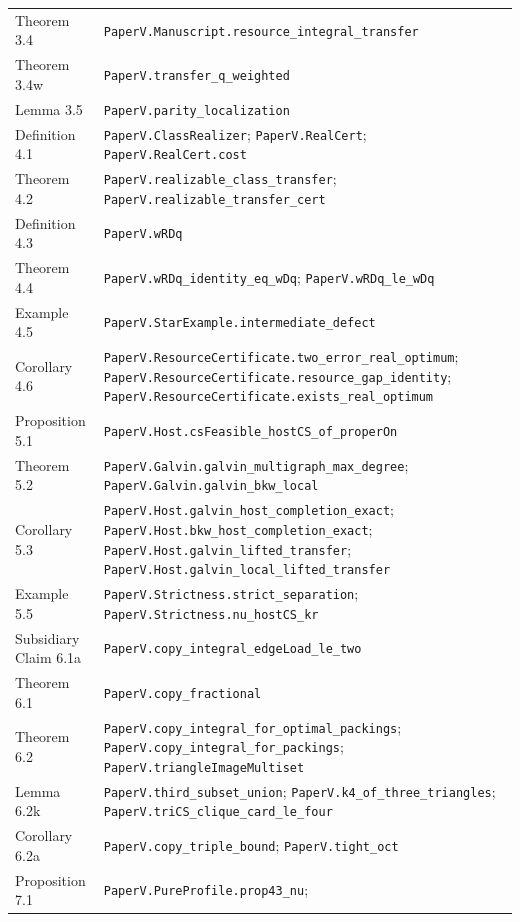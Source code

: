 \documentclass[english,11pt,a4paper]{article}
\begin{document}
{\begin{longtable}[]{@{}
  >{\raggedright\arraybackslash}p{}
  >{\raggedright\arraybackslash}p{}@{}}
Theorem 3.4 & \nolinkurl{PaperV.Manuscript.resource_integral_transfer} \\
Theorem 3.4w & \nolinkurl{PaperV.transfer_q_weighted} \\
Lemma 3.5 & \nolinkurl{PaperV.parity_localization} \\
Definition 4.1 & \nolinkurl{PaperV.ClassRealizer};
\texttt{PaperV.RealCert}; \nolinkurl{PaperV.RealCert.cost} \\
Theorem 4.2 & \nolinkurl{PaperV.realizable_class_transfer};
\nolinkurl{PaperV.realizable_transfer_cert} \\
Definition 4.3 & \texttt{PaperV.wRDq} \\
Theorem 4.4 & \nolinkurl{PaperV.wRDq_identity_eq_wDq};
\nolinkurl{PaperV.wRDq_le_wDq} \\
Example 4.5 & \nolinkurl{PaperV.StarExample.intermediate_defect} \\
Corollary 4.6 &
\nolinkurl{PaperV.ResourceCertificate.two_error_real_optimum};
\nolinkurl{PaperV.ResourceCertificate.resource_gap_identity};
\nolinkurl{PaperV.ResourceCertificate.exists_real_optimum} \\
Proposition 5.1 &
\nolinkurl{PaperV.Host.csFeasible_hostCS_of_properOn} \\
Theorem 5.2 & \nolinkurl{PaperV.Galvin.galvin_multigraph_max_degree};
\nolinkurl{PaperV.Galvin.galvin_bkw_local} \\
Corollary 5.3 & \nolinkurl{PaperV.Host.galvin_host_completion_exact};
\nolinkurl{PaperV.Host.bkw_host_completion_exact};
\nolinkurl{PaperV.Host.galvin_lifted_transfer};
\nolinkurl{PaperV.Host.galvin_local_lifted_transfer} \\
Example 5.5 & \nolinkurl{PaperV.Strictness.strict_separation};
\nolinkurl{PaperV.Strictness.nu_hostCS_kr} \\
Subsidiary Claim 6.1a &
\nolinkurl{PaperV.copy_integral_edgeLoad_le_two} \\
Theorem 6.1 & \nolinkurl{PaperV.copy_fractional} \\
Theorem 6.2 & \nolinkurl{PaperV.copy_integral_for_optimal_packings};
\nolinkurl{PaperV.copy_integral_for_packings};
\nolinkurl{PaperV.triangleImageMultiset} \\
Lemma 6.2k & \nolinkurl{PaperV.third_subset_union};
\nolinkurl{PaperV.k4_of_three_triangles};
\nolinkurl{PaperV.triCS_clique_card_le_four} \\
Corollary 6.2a & \nolinkurl{PaperV.copy_triple_bound};
\texttt{PaperV.tight\_oct} \\
Proposition 7.1 & \nolinkurl{PaperV.PureProfile.prop43_nu};

\end{longtable}}
\end{document}
